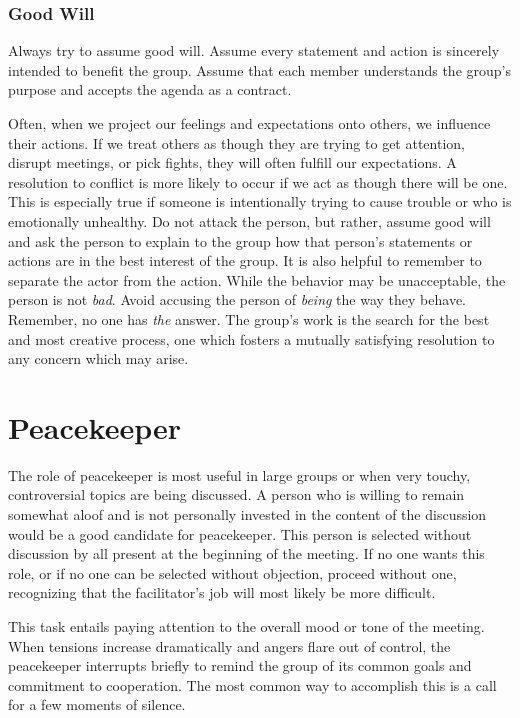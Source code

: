 \subsubsection*{Good Will}

Always try to assume good will. Assume every statement and action
is sincerely intended to benefit the group. Assume that each
member understands the group's purpose and accepts the agenda as a
contract.


Often, when we project our feelings and expectations onto others,
we influence their actions. If we treat others as though they are
trying to get attention, disrupt meetings, or pick fights, they
will often fulfill our expectations. A resolution to conflict is
more likely to occur if we act as though there will be one. This is
especially true if someone is intentionally trying to cause trouble
or who is emotionally unhealthy. Do not attack the person, but
rather, assume good will and ask the person to explain to the group
how that person's statements or actions are in the best interest of
the group. It is also helpful to remember to separate the actor
from the action. While the behavior may be unacceptable, the person
is not \emph{bad}. Avoid accusing the person of \emph{being}
the way they behave. Remember, no one has \emph{the} answer. The
group's work is the search for the best and most creative process,
one which fosters a mutually satisfying resolution to any concern
which may arise.


\section{Peacekeeper}
\label{role:peacekeeper}

The role of peacekeeper is most useful in large groups or when
very touchy, controversial topics are being discussed. A person who
is willing to remain somewhat aloof and is not personally invested
in the content of the discussion would be a good candidate for
peacekeeper. This person is selected without discussion by all
present at the beginning of the meeting. If no one wants this role,
or if no one can be selected without objection, proceed
without one, recognizing that the facilitator's job will most
likely be more difficult.


This task entails paying attention to the overall mood or tone of
the meeting. When tensions increase dramatically and angers flare
out of control, the peacekeeper interrupts briefly to remind the
group of its common goals and commitment to cooperation. The most
common way to accomplish this is a call for a few moments of
silence.


